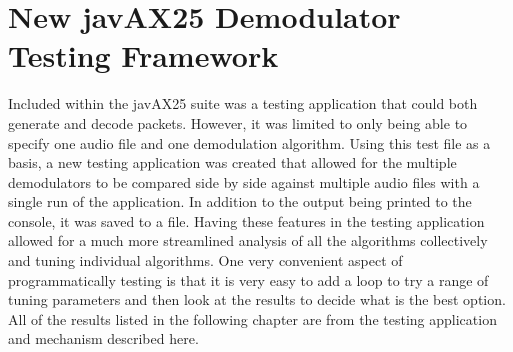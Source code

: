 \section{New javAX25 Demodulator Testing Framework}
Included within the javAX25 suite was a testing application that could both generate and decode packets. However, it was limited to only being able to specify one audio file and one demodulation algorithm. Using this test file as a basis, a new testing application was created that allowed for the multiple demodulators to be compared side by side against multiple audio files with a single run of the application. In addition to the output being printed to the console, it was saved to a file. Having these features in the testing application allowed for a much more streamlined analysis of all the algorithms collectively and tuning individual algorithms. One very convenient aspect of programmatically testing is that it is very easy to add a loop to try a range of tuning parameters and then look at the results to decide what is the best option. All of the results listed in the following chapter are from the testing application and mechanism described here.
